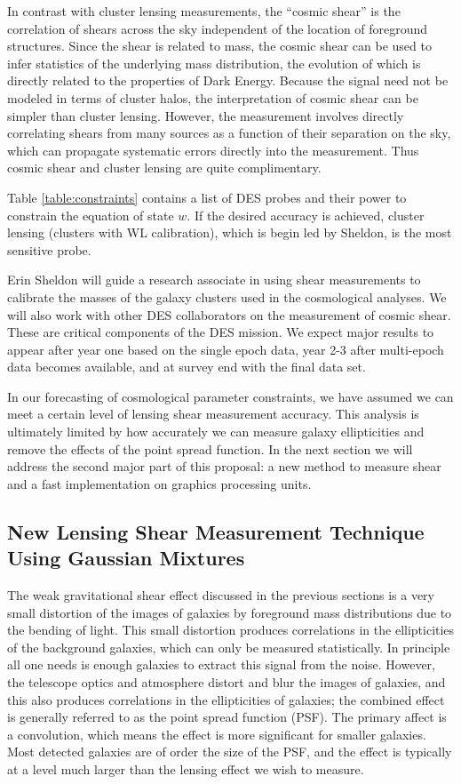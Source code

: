 \documentclass[12pt]{article}
\begin{document}
In contrast with cluster lensing measurements, the ``cosmic shear'' is the
correlation of shears across the sky independent of the location of foreground
structures.  Since the shear is related to mass, the cosmic shear can be used
to infer statistics of the underlying mass distribution, the evolution of which
is directly related to the properties of Dark Energy.  Because the signal need
not be modeled in terms of cluster halos, the interpretation of cosmic shear
can be simpler than cluster lensing.  However, the measurement involves
directly correlating shears from many sources as a function of their separation
on the sky, which can propagate systematic errors directly into the
measurement. Thus cosmic shear and cluster lensing are quite complimentary.

Table \ref{table:constraints} contains a list of DES probes and their power to
constrain the equation of state $w$.  If the desired accuracy is achieved,
cluster lensing (clusters with WL calibration), which is begin led by Sheldon,
is the most sensitive probe.

Erin Sheldon will guide a research associate in using shear measurements to
calibrate the masses of the galaxy clusters used in the cosmological analyses.
We will also work with other DES collaborators on the measurement of cosmic
shear.  These are critical components of the DES mission.  We expect major
results to appear after year one based on the single epoch data, year 2-3 after
multi-epoch data becomes available, and at survey end with the final data set.

In our forecasting of cosmological parameter constraints, we have assumed we
can meet a certain level of lensing shear measurement accuracy.  This analysis
is ultimately limited by how accurately we can measure galaxy ellipticities and
remove the effects of the point spread function.  In the next section we will
address the second major part of this proposal: a new method to measure shear
and a fast implementation on graphics processing units.

\subsection{New Lensing Shear Measurement Technique Using Gaussian Mixtures}
\label{sec:gmix}

The weak gravitational shear effect discussed in the previous sections is a
very small distortion of the images of galaxies by foreground mass
distributions due to the bending of light.  This small distortion produces
correlations in the ellipticities of the background galaxies, which can only be
measured statistically.  In principle all one needs is enough galaxies to
extract this signal from the noise.  However, the telescope optics and
atmosphere distort and blur the images of galaxies, and this also produces
correlations in the ellipticities of galaxies; the combined effect is generally
referred to as the point spread function (PSF). The primary affect is a
convolution, which means the effect is more significant for smaller galaxies.
Most detected galaxies are of order the size of the PSF, and the effect is
typically at a level much larger than the lensing effect we wish to measure.
\end{document}
